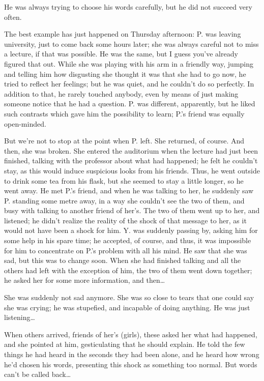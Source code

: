 He was always trying to choose his words carefully, but he did not succeed very often.

The best example has just happened on Thursday afternoon: P. was leaving university, just to come back some hours later; she was always careful not to miss a lecture, if that was possible. He was the same, but I guess you've already figured that out. While she was playing with his arm in a friendly way, jumping and telling him how disgusting she thought it was that she had to go now, he tried to reflect her feelings; but he was quiet, and he couldn't do so perfectly. In addition to that, he rarely touched anybody, even by means of just making someone notice that he had a question. P. was different, apparently, but he liked such contrasts which gave him the possibility to learn; P.'s friend was equally open-minded.

But we're not to stop at the point when P. left. She returned, of course. And then, she was broken. She entered the auditorium when the lecture had just been finished, talking with the professor about what had happened; he felt he couldn't stay, as this would induce suspicious looks from his friends. Thus, he went outside to drink some tea from his flask, but she seemed to stay a little longer, so he went away. He met P.'s friend, and when he was talking to her, he suddenly saw P. standing some metre away, in a way she couldn't see the two of them, and busy with talking to another friend of her's. The two of them went up to her, and listened; he didn't realize the reality of the shock of that message to her, as it would not have been a shock for him. Y. was suddenly passing by, asking him for some help in his spare time; he accepted, of course, and thus, it was impossible for him to concentrate on P.'s problem with all his mind. He saw that she was sad, but this was to change soon. When she had finished talking and all the others had left with the exception of him, the two of them went down together; he asked her for some more information, and then\dots{}

She was suddenly not sad anymore. She was so close to tears that one could say she was crying; he was stupefied, and incapable of doing anything. He was just listening\dots{}

When others arrived, friends of her's (girls), these asked her what had happened, and she pointed at him, gesticulating that he should explain. He told the few things he had heard in the seconds they had been alone, and he heard how wrong he'd chosen his words, presenting this shock as something too normal. But words can't be called back\dots{}

